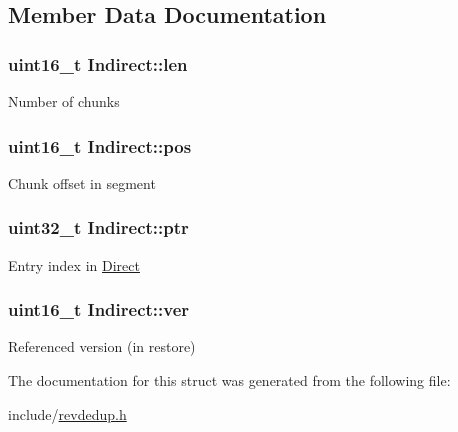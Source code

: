 \subsection{\-Member \-Data \-Documentation}
\hypertarget{structIndirect_a08b02afe989e584c66794b3728bddf78}{
\subsubsection[{len}]{\setlength{\rightskip}{0pt plus 5cm}uint16\-\_\-t {\bf \-Indirect\-::len}}}\label{structIndirect_a08b02afe989e584c66794b3728bddf78}
\-Number of chunks \hypertarget{structIndirect_a635344862b3a3ba8501476e6acc26749}{
\subsubsection[{pos}]{\setlength{\rightskip}{0pt plus 5cm}uint16\-\_\-t {\bf \-Indirect\-::pos}}}\label{structIndirect_a635344862b3a3ba8501476e6acc26749}
\-Chunk offset in segment \hypertarget{structIndirect_a5396d5e3a2dfcaa56508d9c95a3ccd59}{
\subsubsection[{ptr}]{\setlength{\rightskip}{0pt plus 5cm}uint32\-\_\-t {\bf \-Indirect\-::ptr}}}\label{structIndirect_a5396d5e3a2dfcaa56508d9c95a3ccd59}
\-Entry index in \hyperlink{structDirect}{\-Direct} \hypertarget{structIndirect_acfeca4a51291e8071fddba92c2c64912}{
\subsubsection[{ver}]{\setlength{\rightskip}{0pt plus 5cm}uint16\-\_\-t {\bf \-Indirect\-::ver}}}\label{structIndirect_acfeca4a51291e8071fddba92c2c64912}
\-Referenced version (in restore) 

\-The documentation for this struct was generated from the following file\-:\begin{DoxyCompactItemize}
\item 
include/\hyperlink{revdedup_8h}{revdedup.\-h}\end{DoxyCompactItemize}
